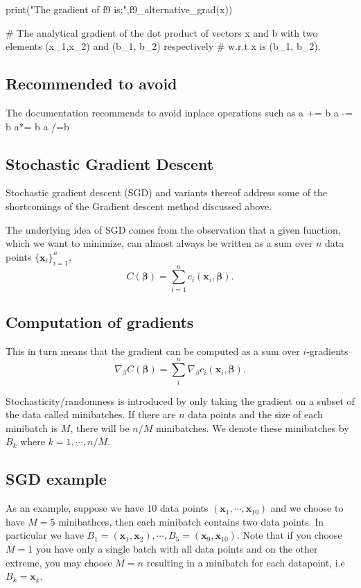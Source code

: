 \documentclass[%
oneside,                 %
final,                   %
10pt]{article}
\begin{document}
print("The gradient of f9 is:",f9_alternative_grad(x))

# The analytical gradient of the dot product of vectors x and b with two elements (x_1,x_2) and (b_1, b_2) respectively
# w.r.t x is (b_1, b_2).
\epycod

\subsection{Recommended to avoid}
The documentation recommends to avoid inplace operations such as
\bpycod
a += b
a -= b
a*= b
a /=b
\epycod

\subsection{Stochastic Gradient Descent}

Stochastic gradient descent (SGD) and variants thereof address some of
the shortcomings of the Gradient descent method discussed above.

The underlying idea of SGD comes from the observation that a given 
function, which we want to minimize, can almost always be written as a
sum over $n$ data points $\{\mathbf{x}_i\}_{i=1}^n$,
\[
C(\mathbf{\beta}) = \sum_{i=1}^n c_i(\mathbf{x}_i,
\mathbf{\beta}). 
\]

\subsection{Computation of gradients}

This in turn means that the gradient can be
computed as a sum over $i$-gradients 
\[
\nabla_\beta C(\mathbf{\beta}) = \sum_i^n \nabla_\beta c_i(\mathbf{x}_i,
\mathbf{\beta}).
\]

Stochasticity/randomness is introduced by only taking the
gradient on a subset of the data called minibatches.  If there are $n$
data points and the size of each minibatch is $M$, there will be $n/M$
minibatches. We denote these minibatches by $B_k$ where
$k=1,\cdots,n/M$.

\subsection{SGD example}
As an example, suppose we have $10$ data points $(\mathbf{x}_1,\cdots, \mathbf{x}_{10})$ 
and we choose to have $M=5$ minibathces,
then each minibatch contains two data points. In particular we have
$B_1 = (\mathbf{x}_1,\mathbf{x}_2), \cdots, B_5 =
(\mathbf{x}_9,\mathbf{x}_{10})$. Note that if you choose $M=1$ you
have only a single batch with all data points and on the other extreme,
you may choose $M=n$ resulting in a minibatch for each datapoint, i.e
$B_k = \mathbf{x}_k$.
\end{document}
